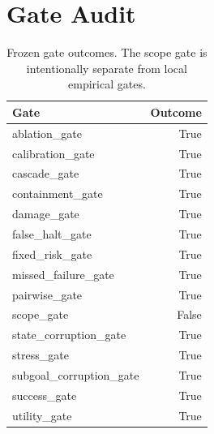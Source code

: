 \documentclass{article}
\begin{document}
\section{Gate Audit}
\begin{table}[h]
\centering
\caption{Frozen gate outcomes. The scope gate is intentionally separate from local empirical gates.}
\begin{tabular}{lr}
\toprule
Gate & Outcome\\
\midrule
ablation\_gate & True \\
calibration\_gate & True \\
cascade\_gate & True \\
containment\_gate & True \\
damage\_gate & True \\
false\_halt\_gate & True \\
fixed\_risk\_gate & True \\
missed\_failure\_gate & True \\
pairwise\_gate & True \\
scope\_gate & False \\
state\_corruption\_gate & True \\
stress\_gate & True \\
subgoal\_corruption\_gate & True \\
success\_gate & True \\
utility\_gate & True \\
\bottomrule
\end{tabular}
\end{table}
\end{document}
